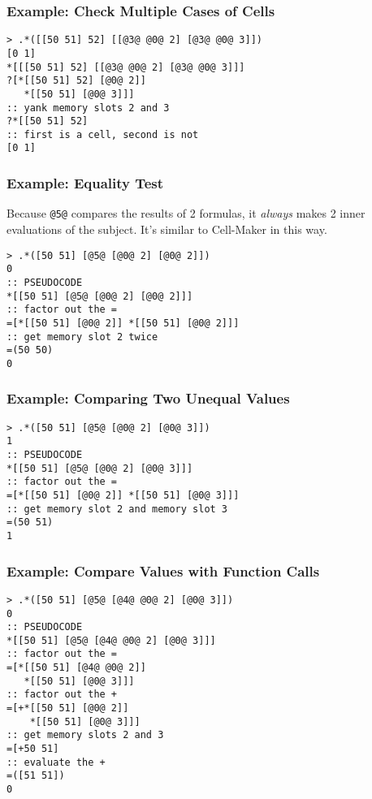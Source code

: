 \documentclass[twoside]{article}
\begin{document}
\subsubsection{Example:  Check Multiple Cases of Cells}

\begin{lstlisting}[style=listingcode]
> .*([[50 51] 52] [[@3@ @0@ 2] [@3@ @0@ 3]])
[0 1]
*[[[50 51] 52] [[@3@ @0@ 2] [@3@ @0@ 3]]]
?[*[[50 51] 52] [@0@ 2]]
   *[[50 51] [@0@ 3]]]
:: yank memory slots 2 and 3
?*[[50 51] 52]
:: first is a cell, second is not
[0 1]
\end{lstlisting}

\subsubsection{Example:  Equality Test}

Because \lstinline[style=inlinecode]{@5@} compares the results of 2 formulas, it \emph{always} makes 2 inner evaluations of the subject. It's similar to Cell-Maker in this way.

\begin{lstlisting}[style=listingcode]
> .*([50 51] [@5@ [@0@ 2] [@0@ 2]])
0
:: PSEUDOCODE
*[[50 51] [@5@ [@0@ 2] [@0@ 2]]]
:: factor out the =
=[*[[50 51] [@0@ 2]] *[[50 51] [@0@ 2]]]
:: get memory slot 2 twice
=(50 50)
0
\end{lstlisting}

\subsubsection{Example:  Comparing Two Unequal Values}

\begin{lstlisting}[style=listingcode]
> .*([50 51] [@5@ [@0@ 2] [@0@ 3]])
1
:: PSEUDOCODE
*[[50 51] [@5@ [@0@ 2] [@0@ 3]]]
:: factor out the =
=[*[[50 51] [@0@ 2]] *[[50 51] [@0@ 3]]]
:: get memory slot 2 and memory slot 3
=(50 51)
1
\end{lstlisting}

\subsubsection{Example:  Compare Values with Function Calls}

\begin{lstlisting}[style=listingcode]
> .*([50 51] [@5@ [@4@ @0@ 2] [@0@ 3]])
0
:: PSEUDOCODE
*[[50 51] [@5@ [@4@ @0@ 2] [@0@ 3]]]
:: factor out the =
=[*[[50 51] [@4@ @0@ 2]]
   *[[50 51] [@0@ 3]]]
:: factor out the +
=[+*[[50 51] [@0@ 2]]
    *[[50 51] [@0@ 3]]]
:: get memory slots 2 and 3
=[+50 51]
:: evaluate the +
=([51 51])
0
\end{lstlisting}
\end{document}
